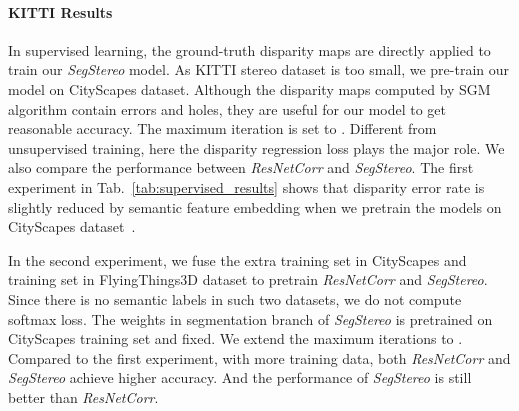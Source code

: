 \documentclass[runningheads]{llncs}
\begin{document}
\paragraph{\textbf{KITTI Results }} In supervised learning, the ground-truth disparity maps are directly applied to train our \emph{SegStereo} model. As KITTI stereo dataset is too small, we pre-train our model on CityScapes dataset. Although the disparity maps computed by SGM algorithm contain errors and holes, they are useful for our model to get reasonable accuracy. The maximum iteration is set to . Different from unsupervised training, here the disparity regression loss  plays the major role. We also compare the performance between \emph{ResNetCorr} and \emph{SegStereo}. The first experiment in Tab.~\ref{tab:supervised_results} shows that disparity error rate is slightly reduced by semantic feature embedding when we pretrain the models on CityScapes dataset~\cite{cordts2016cityscapes}. 

In the second experiment, we fuse the extra training set in CityScapes and training set in FlyingThings3D dataset to pretrain \emph{ResNetCorr} and \emph{SegStereo}. Since there is no semantic labels in such two datasets, we do not compute softmax loss. The weights in segmentation branch of \emph{SegStereo} is pretrained on CityScapes training set and fixed. We extend the maximum iterations to . Compared to the first experiment, with more training data, both \emph{ResNetCorr} and \emph{SegStereo} achieve higher accuracy. And the performance of \emph{SegStereo} is still better than \emph{ResNetCorr}.
\end{document}
